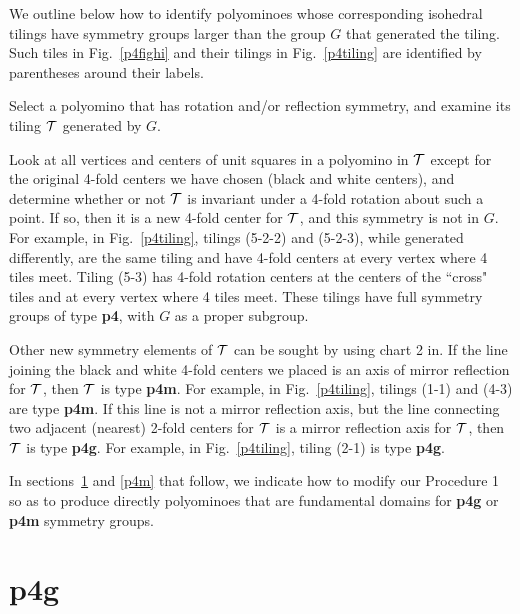 \documentclass{ws-ijcga}
\begin{document}
We outline below how to identify polyominoes whose corresponding isohedral tilings
have symmetry groups larger than the group $G$ that generated the tiling. 
Such tiles in Fig.~\ref{p4fighi} and their tilings in Fig.~\ref{p4tiling} are identified by 
parentheses around their labels.
\begin{itemlist}
\item
Select a polyomino that has rotation and/or reflection symmetry, and examine its
tiling $\cal T$ generated by $G$.
\item
Look at all vertices and centers of unit squares in a polyomino in $\cal T$ except for the
original 4-fold centers we have chosen (black and white centers), and determine whether
or not $\cal T$ is invariant under a 4-fold rotation about such a point. 
If so, then it is a new 4-fold center for $\cal T$, and this symmetry is not in $G$. 
For example, in Fig.~\ref{p4tiling}, tilings (5-2-2)
and (5-2-3), while generated differently, are the same tiling and have 4-fold centers at
every vertex where 4 tiles meet. 
Tiling (5-3) has 4-fold rotation centers at the centers of
the ``cross" tiles and at every vertex where 4 tiles meet. 
These tilings have full symmetry groups of type {\bf p4}, with $G$ as a proper subgroup.
\item
Other new symmetry elements of $\cal T$ can be sought by using chart 2 in\cite{schatt}. If the line joining the black and white 4-fold centers we placed is
an axis of mirror reflection for $\cal T$, then $\cal T$ is type {\bf p4m}. 
For example, in Fig.~\ref{p4tiling}, tilings (1-1)
and (4-3) are type {\bf p4m}. 
If this line is not a mirror reflection axis, but the line connecting
two adjacent (nearest) 2-fold centers for $\cal T$ is a mirror reflection axis for $\cal T$, 
then $\cal T$ is type {\bf p4g}. 
For example, in Fig.~\ref{p4tiling}, tiling (2-1) is type {\bf p4g}.
\end{itemlist}

In sections~\ref{p4g} and \ref{p4m} that follow, 
we indicate how to modify our Procedure 1 so as to
produce directly polyominoes that are fundamental domains for {\bf p4g} or {\bf p4m} symmetry
groups.











\section{{\bf p4g}}
\label{p4g}
\end{document}
